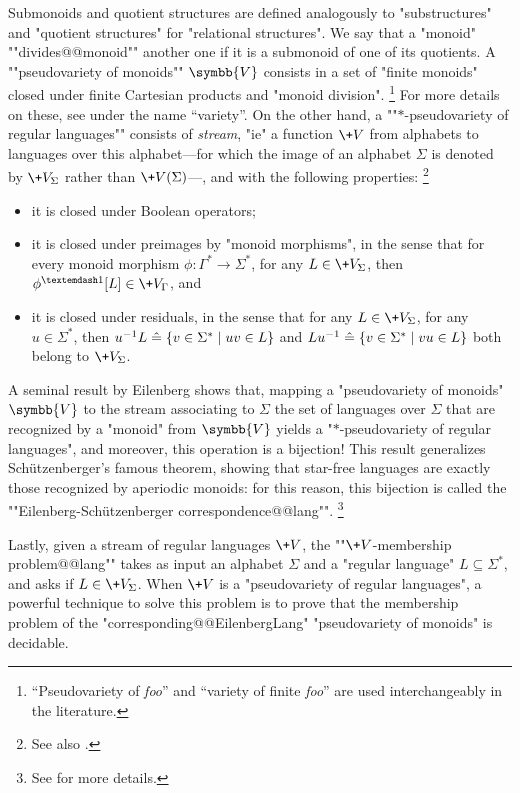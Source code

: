 Submonoids and quotient structures are defined analogously to
"substructures" and "quotient structures" for "relational structures".
We say that a "monoid" \AP""divides@@monoid"" another one if it is
a submonoid of one of its quotients.
A \AP""pseudovariety of monoids"" $\symbb{V}$%
consists in a set of "finite monoids" closed under finite Cartesian products
and "monoid division".%
\footnote{``Pseudovariety of \emph{foo}'' and ``variety of finite \emph{foo}''
are used interchangeably in the literature.}
For more details on these,
see \cite[\S~XI.1, p.~189]{Pin2022MathematicalFoundations} under the name ``variety''.
On the other hand, a ""$\ast$-pseudovariety of regular languages""
consists of \emph{stream}, "ie" a function $\+V$ from alphabets to languages over this alphabet---for which the image of an alphabet $\Sigma$ is denoted by
$\+V_{\Sigma}$ rather than $\+V(\Sigma)$---, and with the following properties:%
\footnote{See also \cite[\S~XIII.3, p.~226]{Pin2022MathematicalFoundations}.}
\begin{itemize}
	\item it is closed under Boolean operators;
	\item it is closed under preimages by "monoid morphisms", in the sense that
		for every monoid morphism $\phi\colon \Gamma^* \to \Sigma^*$, for any $L \in \+V_{\Sigma}$,
		then $\phi^{—1}[L] \in \+V_{\Gamma}$, and
	\item it is closed under residuals, in the sense that for any $L \in \+V_{\Sigma}$,
		for any $u\in\Sigma^*$, then
		$u^{-1}L \mathrel{\hat{=}} \{v \in \Sigma^* \mid uv \in L\}$
		and $Lu^{-1} \mathrel{\hat{=}} \{v \in \Sigma^* \mid vu \in L\}$
		both belong to $\+V_{\Sigma}$.
\end{itemize}
A seminal result by Eilenberg shows that, mapping a "pseudovariety of monoids" $\symbb{V}$
to the stream associating to $\Sigma$ the set of languages over $\Sigma$ that are recognized
by a "monoid" from $\symbb{V}$ yields a "$*$-pseudovariety of regular languages",
and moreover, this operation is a bijection!
This result generalizes Schützenberger's famous theorem, showing that
star-free languages are exactly those recognized by aperiodic monoids:
for this reason, this bijection is called the \AP""Eilenberg-Schützenberger correspondence@@lang"".%
\footnote{See \cite[Theorem XIII.4.10, p.~228]{Pin2022MathematicalFoundations} for more details.}

Lastly, given a stream of regular languages $\+V$, the \AP""$\+V$-membership problem@@lang""
takes as input an alphabet $\Sigma$ and a "regular language" $L \subseteq \Sigma^*$,
and asks if $L \in \+V_{\Sigma}$. When $\+V$ is a "pseudovariety of regular languages",
a powerful technique to solve this problem is to prove that the membership problem
of the "corresponding@@EilenbergLang" "pseudovariety of monoids" is decidable.

